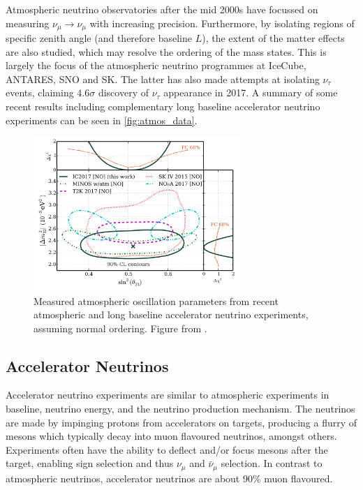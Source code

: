 Atmospheric neutrino observatories after the mid 2000s have focussed on measuring $\nu_\mu\rightarrow\nu_\mu$ with increasing precision. Furthermore, by isolating regions of specific zenith angle (and therefore baseline $L$), the extent of the matter effects are also studied, which may resolve the ordering of the mass states. This is largely the focus of the atmospheric neutrino programmes at IceCube\cite{icecube}, ANTARES\cite{antares}, SNO \cite{sno_atmos} and SK\cite{superk}. The latter has also made attempts at isolating $\nu_\tau$ events\cite{superk_tau}, claiming $4.6\sigma$ discovery of $\nu_\tau$ appearance in 2017. A summary of some recent results including complementary long baseline accelerator neutrino experiments can be seen in \autoref{fig:atmos_data}.
\begin{figure}[h]
	\includegraphics[width=0.7\textwidth, trim={0mm 0mm 0mm 0mm}, clip,page=1]{figures/theory/icecube_comp}
	\caption{Measured atmospheric oscillation parameters from recent atmospheric and long baseline accelerator neutrino experiments, assuming normal ordering. Figure from \cite{icecube}.}
	\label{fig:atmos_data}
\end{figure}

\subsection{Accelerator Neutrinos}
Accelerator neutrino experiments are similar to atmospheric experiments in baseline, neutrino energy, and the neutrino production mechanism. The neutrinos are made by impinging protons from accelerators on targets, producing a flurry of mesons which typically decay into muon flavoured neutrinos, amongst others. Experiments often have the ability to deflect and/or focus mesons after the target, enabling sign selection and thus $\nu_\mu$ and $\bar{\nu}_\mu$ selection. In contrast to atmospheric neutrinos, accelerator neutrinos are about 90\% muon flavoured.

